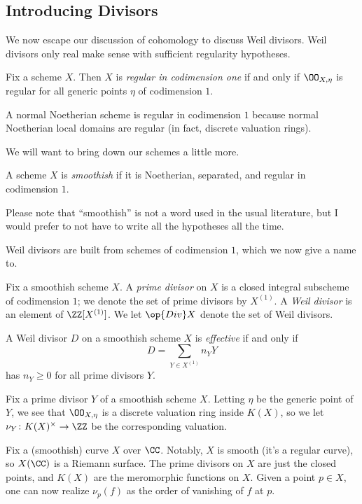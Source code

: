 \documentclass[../notes.tex]{subfiles}
\begin{document}
\subsection{Introducing Divisors}
We now escape our discussion of cohomology to discuss Weil divisors. Weil divisors only real make sense with sufficient regularity hypotheses.
\begin{definition}
	Fix a scheme $X$. Then $X$ is \textit{regular in codimension one} if and only if $\OO_{X,\eta}$ is regular for all generic points $\eta$ of codimension $1$.
\end{definition}
\begin{remark}
	A normal Noetherian scheme is regular in codimension $1$ because normal Noetherian local domains are regular (in fact, discrete valuation rings).
\end{remark}
We will want to bring down our schemes a little more.
\begin{definition}[smoothish]
	A scheme $X$ is \textit{smoothish} if it is Noetherian, separated, and regular in codimension $1$.
\end{definition}
Please note that ``smoothish'' is not a word used in the usual literature, but I would prefer to not have to write all the hypotheses all the time.

Weil divisors are built from schemes of codimension $1$, which we now give a name to.
\begin{definition}
	Fix a smoothish scheme $X$. A \textit{prime divisor} on $X$ is a closed integral subscheme of codimension $1$; we denote the set of prime divisors by $X^{(1)}$. A \textit{Weil divisor} is an element of $\ZZ[X^{(1)}]$. We let $\op{Div}X$ denote the set of Weil divisors.
\end{definition}
\begin{defihelper}[effective] 
	A Weil divisor $D$ on a smoothish scheme $X$ is \textit{effective} if and only if
	\[D=\sum_{Y\in X^{(1)}}n_YY\]
	has $n_Y\ge0$ for all prime divisors $Y$.
\end{defihelper}
\begin{notation}
	Fix a prime divisor $Y$ of a smoothish scheme $X$. Letting $\eta$ be the generic point of $Y$, we see that $\OO_{X,\eta}$ is a discrete valuation ring inside $K(X)$, so we let $\nu_Y\colon K(X)^\times\to\ZZ$ be the corresponding valuation.
\end{notation}
\begin{example}
	Fix a (smoothish) curve $X$ over $\CC$. Notably, $X$ is smooth (it's a regular curve), so $X(\CC)$ is a Riemann surface. The prime divisors on $X$ are just the closed points, and $K(X)$ are the meromorphic functions on $X$. Given a point $p\in X$, one can now realize $\nu_p(f)$ as the order of vanishing of $f$ at $p$.
\end{example}
\end{document}
